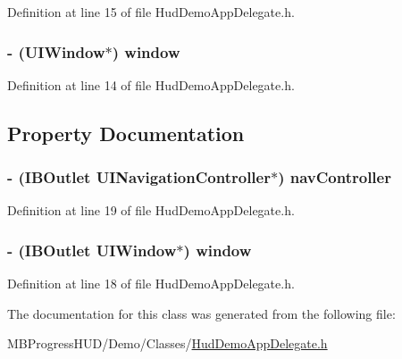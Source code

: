 Definition at line 15 of file HudDemoAppDelegate.h.

\hypertarget{interface_hud_demo_app_delegate_ae04748cdefebda525b266731b6c120a2}{
\subsubsection[{window}]{\setlength{\rightskip}{0pt plus 5cm}-\/ (UIWindow$\ast$) {\bf window}}}
\label{interface_hud_demo_app_delegate_ae04748cdefebda525b266731b6c120a2}


Definition at line 14 of file HudDemoAppDelegate.h.



\subsection{Property Documentation}
\hypertarget{interface_hud_demo_app_delegate_a155d6597b8f13f7e9196524c36c73803}{
\subsubsection[{navController}]{\setlength{\rightskip}{0pt plus 5cm}-\/ (IBOutlet UINavigationController$\ast$) {\bf navController}}}
\label{interface_hud_demo_app_delegate_a155d6597b8f13f7e9196524c36c73803}


Definition at line 19 of file HudDemoAppDelegate.h.

\hypertarget{interface_hud_demo_app_delegate_a055d472434a4ee0b915c207957a400e1}{
\subsubsection[{window}]{\setlength{\rightskip}{0pt plus 5cm}-\/ (IBOutlet UIWindow$\ast$) {\bf window}}}
\label{interface_hud_demo_app_delegate_a055d472434a4ee0b915c207957a400e1}


Definition at line 18 of file HudDemoAppDelegate.h.



The documentation for this class was generated from the following file:\begin{DoxyCompactItemize}
\item 
MBProgressHUD/Demo/Classes/\hyperlink{_hud_demo_app_delegate_8h}{HudDemoAppDelegate.h}\end{DoxyCompactItemize}
